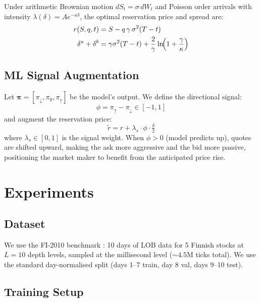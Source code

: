 \documentclass[11pt,a4paper]{article}
\begin{document}
Under arithmetic Brownian motion $dS_t = \sigma\,dW_t$ and Poisson order
arrivals with intensity $\lambda(\delta) = A e^{-\kappa\delta}$, the
optimal reservation price and spread are:
\begin{align}
  r(S,q,t) &= S - q\,\gamma\,\sigma^2(T-t) \label{eq:reservation}\\
  \delta^a + \delta^b &= \gamma\sigma^2(T-t) +
    \frac{2}{\gamma}\ln\!\Bigl(1+\frac{\gamma}{\kappa}\Bigr) \label{eq:spread}
\end{align}

\subsection{ML Signal Augmentation}

Let $\boldsymbol{\pi} = [\pi_\downarrow, \pi_0, \pi_\uparrow]$ be the
model's output.  We define the directional signal:
\[
  \phi = \pi_\uparrow - \pi_\downarrow \in [-1,1]
\]
and augment the reservation price:
\[
  \tilde{r} = r + \lambda_s \cdot \phi \cdot \tfrac{\delta}{2}
\]
where $\lambda_s \in [0,1]$ is the signal weight.  When $\phi > 0$ (model
predicts up), quotes are shifted upward, making the ask more aggressive and
the bid more passive, positioning the market maker to benefit from the
anticipated price rise.

\section{Experiments}
\label{sec:experiments}

\subsection{Dataset}

We use the FI-2010 benchmark \citep{ntakaris2018benchmark}: 10 days of
LOB data for 5 Finnish stocks at $L=10$ depth levels, sampled at the
millisecond level ($\sim\!4.5\text{M}$ ticks total).  We use the
standard day-normalised split (days 1--7 train, day 8 val, days 9--10 test).

\subsection{Training Setup}
\end{document}
